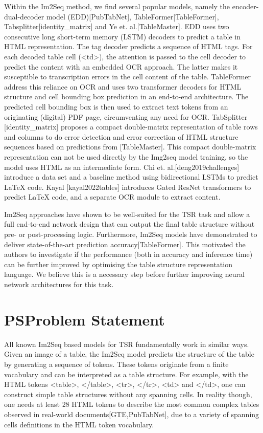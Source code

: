 \documentclass[11pt,a4paper]{article}
\begin{document}
Within the Im2Seq method, we find several popular models, namely the encoder-dual-decoder model (EDD)[PubTabNet], TableFormer[TableFormer], Tabsplitter[identity\_matrix] and Ye et. al.[TableMaster]. EDD uses two consecutive long short-term memory (LSTM) decoders to predict a table in HTML representation. The tag decoder predicts a sequence of HTML tags. For each decoded table cell (<td>), the attention is passed to the cell decoder to predict the content with an embedded OCR approach. The latter makes it susceptible to transcription errors in the cell content of the table. TableFormer address this reliance on OCR and uses two transformer decoders for HTML structure and cell bounding box prediction in an end-to-end architecture. The predicted cell bounding box is then used to extract text tokens from an originating (digital) PDF page, circumventing any need for OCR. TabSplitter [identity\_matrix] proposes a compact double-matrix representation of table rows and columns to do error detection and error correction of HTML structure sequences based on predictions from [TableMaster]. This compact double-matrix representation can not be used directly by the Img2seq model training, so the model uses HTML as an intermediate form. Chi et. al.[deng2019challenges] introduce a data set and a baseline method using bidirectional LSTMs to predict LaTeX code. Kayal [kayal2022tables] introduces Gated ResNet transformers to predict LaTeX code, and a separate OCR module to extract content.

Im2Seq approaches have shown to be well-suited for the TSR task and allow a full end-to-end network design that can output the final table structure without pre- or post-processing logic. Furthermore, Im2Seq models have demonstrated to deliver state-of-the-art prediction accuracy[TableFormer]. This motivated the authors to investigate if the performance (both in accuracy and inference time) can be further improved by optimising the table structure representation language. We believe this is a necessary step before further improving neural network architectures for this task.

\section{PSProblem Statement}

All known Im2Seq based models for TSR fundamentally work in similar ways. Given an image of a table, the Im2Seq model predicts the structure of the table by generating a sequence of tokens. These tokens originate from a finite vocabulary and can be interpreted as a table structure. For example, with the HTML tokens <table>, </table>, <tr>, </tr>, <td> and </td>, one can construct simple table structures without any spanning cells. In reality though, one needs at least 28 HTML tokens to describe the most common complex tables observed in real-world documents[GTE,PubTabNet], due to a variety of spanning cells definitions in the HTML token vocabulary.
\end{document}
